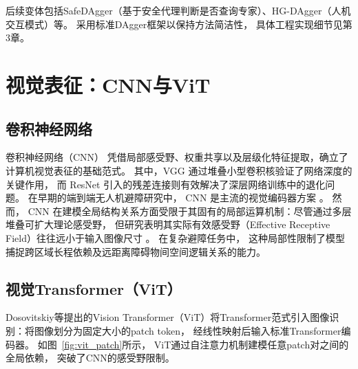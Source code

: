 后续变体包括SafeDAgger\cite{Zhang2016QueryDAgger}（基于安全代理判断是否查询专家）、HG-DAgger\cite{Kelly2019HG_DAgger}（人机交互模式）等。
采用标准DAgger框架以保持方法简洁性，
具体工程实现细节见第3章。

\section{视觉表征：CNN与ViT}

\subsection{卷积神经网络}

卷积神经网络（CNN）\cite{Lecun1998CNN} 凭借局部感受野、权重共享以及层级化特征提取，确立了计算机视觉表征的基础范式。
其中，VGG \cite{Simonyan2015VGG} 通过堆叠小型卷积核验证了网络深度的关键作用，
而 ResNet \cite{He2016ResNet} 引入的残差连接则有效解决了深层网络训练中的退化问题。
在早期的端到端无人机避障研究中，
CNN 是主流的视觉编码器方案 \cite{Loquercio2018DroNet,Sadeghi2017CAD2RL}。
然而，
CNN 在建模全局结构关系方面受限于其固有的局部运算机制：尽管通过多层堆叠可扩大理论感受野，
但研究表明其实际有效感受野（Effective Receptive Field）往往远小于输入图像尺寸 \cite{Lecun1998CNN}。
在复杂避障任务中，
这种局部性限制了模型捕捉跨区域长程依赖及远距离障碍物间空间逻辑关系的能力。

\subsection{视觉Transformer（ViT）}

Dosovitskiy等提出的Vision Transformer（ViT）\cite{Dosovitskiy2020ViT}将Transformer\cite{Vaswani2017Transformer}范式引入图像识别：将图像划分为固定大小的patch token，
经线性映射后输入标准Transformer编码器。
如图~\ref{fig:vit_patch}所示，
ViT通过自注意力机制建模任意patch对之间的全局依赖，
突破了CNN的感受野限制。

